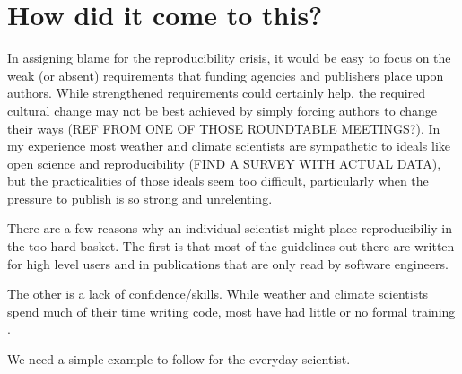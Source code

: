 \section{How did it come to this?}

In assigning blame for the reproducibility crisis, it would be easy to focus on the weak (or absent) requirements that funding agencies and publishers place upon authors. While strengthened requirements could certainly help, the required cultural change may not be best achieved by simply forcing authors to change their ways (REF FROM ONE OF THOSE ROUNDTABLE MEETINGS?). In my experience most weather and climate scientists are sympathetic to ideals like open science and reproducibility (FIND A SURVEY WITH ACTUAL DATA), but the practicalities of those ideals seem too difficult, particularly when the pressure to publish is so strong and unrelenting. 

There are a few reasons why an individual scientist might place reproducibiliy in the too hard basket. The first is that most of the guidelines out there are written for high level users and in publications that are only read by software engineers.

The other is a lack of confidence/skills. While weather and climate scientists spend much of their time writing code, most have had little or no formal training \citet{Hannay2009}.   


We need a simple example to follow for the everyday scientist.
